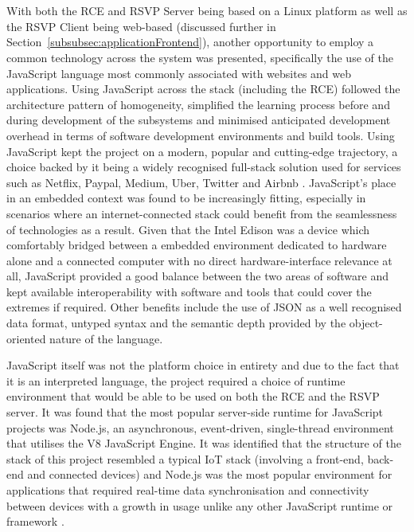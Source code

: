       \\\\
        With both the RCE and RSVP Server being based on a Linux platform as well as the RSVP Client being web-based (discussed further in Section~\ref{subsubsec:applicationFrontend}), another opportunity to employ a common technology across the system was presented, specifically the use of the JavaScript language most commonly associated with websites and web applications. Using JavaScript across the stack (including the RCE) followed the architecture pattern of homogeneity, simplified the learning process before and during development of the subsystems and minimised anticipated development overhead in terms of software development environments and build tools. Using JavaScript kept the project on a modern, popular and cutting-edge trajectory, a choice backed by it being a widely recognised full-stack solution used for services such as Netflix, Paypal, Medium, Uber, Twitter and Airbnb \cite{nodeusers_2016} \cite{driesbuytaert_2016}. JavaScript's place in an embedded context was found to be increasingly fitting, especially in scenarios where an internet-connected stack could benefit from the seamlessness of technologies as a result. Given that the Intel Edison was a device which comfortably bridged between a embedded environment dedicated to hardware alone and a connected computer with no direct hardware-interface relevance at all, JavaScript provided a good balance between the two areas of software and kept available interoperability with software and tools that could cover the extremes if required. Other benefits include the use of JSON as a well recognised data format, untyped syntax and the semantic depth provided by the object-oriented nature of the language.
        
        JavaScript itself was not the platform choice in entirety and due to the fact that it is an interpreted language, the project required a choice of runtime environment that would be able to be used on both the RCE and the RSVP server. It was found that the most popular server-side runtime for JavaScript projects was Node.js, an asynchronous, event-driven, single-thread environment that utilises the V8 JavaScript Engine. It was identified that the structure of the stack of this project resembled a typical IoT stack (involving a front-end, back-end and connected devices) and Node.js was the most popular environment for applications that required real-time data synchronisation and connectivity between devices with a growth in usage unlike any other JavaScript runtime or framework \cite{nodejsSurvey_2016}.
        
